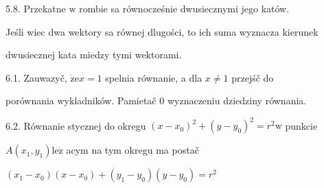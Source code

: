 \documentclass[a4paper,12pt]{article}
\begin{document}
5.8. Przekatne $\mathrm{w}$ rombie sa równocześnie dwusiecznymi jego katów.

Jeśli wiec dwa wektory sa równej dlugości, to ich suma wyznacza kierunek

dwusiecznej kata miedzy tymi wektorami.

6.1. Zauwazyč, $\dot{\mathrm{z}}\mathrm{e} x = 1$ spelnia równanie, a dla $x \neq 1$ przejśč do

porównania wykladników. Pamietač $0$ wyznaczeniu dziedziny równania.

6.2. Równanie stycznej do okregu $(x-x_{0})^{2}+(y-y_{0})^{2}=r^{2}\mathrm{w}$ punkcie

$A(x_{1},y_{1})\mathrm{l}\mathrm{e}\dot{\mathrm{z}}$ acym na tym okregu ma postač

$(x_{1}-x_{0})(x-x_{0})+(y_{1}-y_{0})(y-y_{0})=r^{2}$
\end{document}
